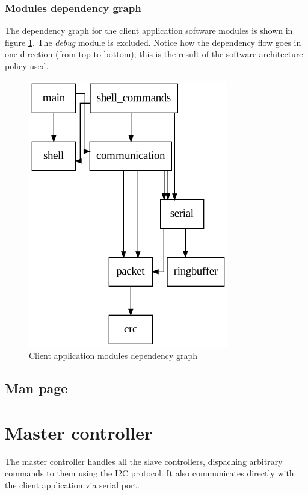 \documentclass[binding=0.6cm,Lau]{sapthesis}
\makeatletter
\def\maxwidth#1{\ifdim\Gin@nat@width>#1 #1\else\Gin@nat@width\fi}
\makeatother
\begin{document}
\subsection{Modules dependency graph}
The dependency graph for the client application software modules is shown in
figure \ref{img:client-deps-graph}. The \emph{debug} module is excluded. Notice
how the dependency flow goes in one direction (from top to bottom); this is the
result of the software architecture policy used.
\begin{figure}[hbp]
\begin{centering}
  \includegraphics[width=\maxwidth{\textwidth}]{img/client}
  \caption{Client application modules dependency graph}
  \label{img:client-deps-graph}
\end{centering}
\end{figure}

\section{Man page}
\label{sec:client-manpage}


\chapter{Master controller}
\label{ch:master}
The master controller handles all the slave controllers, dispaching arbitrary
commands to them using the I2C protocol. It also communicates directly with the
client application via serial port.
\end{document}
